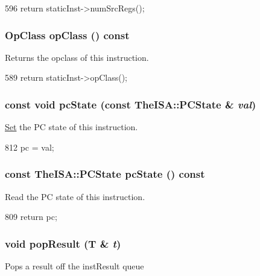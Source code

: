 \begin{DoxyCode}
596 { return staticInst->numSrcRegs(); }
\end{DoxyCode}
\hypertarget{classBaseDynInst_aa4919f97cae20d4d82391c1fc6d5fda6}{
\subsubsection[{opClass}]{\setlength{\rightskip}{0pt plus 5cm}OpClass opClass () const}}
\label{classBaseDynInst_aa4919f97cae20d4d82391c1fc6d5fda6}
Returns the opclass of this instruction. 


\begin{DoxyCode}
589 { return staticInst->opClass(); }
\end{DoxyCode}
\hypertarget{classBaseDynInst_af074e0233f7b4c7bb80ca26182833bf6}{
\subsubsection[{pcState}]{\setlength{\rightskip}{0pt plus 5cm}const void pcState (const TheISA::PCState \& {\em val})}}
\label{classBaseDynInst_af074e0233f7b4c7bb80ca26182833bf6}
\hyperlink{classSet}{Set} the PC state of this instruction. 


\begin{DoxyCode}
812 { pc = val; }
\end{DoxyCode}
\hypertarget{classBaseDynInst_a50cdfb6f4ba5ad01abb9ae5b777d7182}{
\subsubsection[{pcState}]{\setlength{\rightskip}{0pt plus 5cm}const TheISA::PCState pcState () const}}
\label{classBaseDynInst_a50cdfb6f4ba5ad01abb9ae5b777d7182}
Read the PC state of this instruction. 


\begin{DoxyCode}
809 { return pc; }
\end{DoxyCode}
\hypertarget{classBaseDynInst_a8d4a144e868da0550434bd5ec9969982}{
\subsubsection[{popResult}]{\setlength{\rightskip}{0pt plus 5cm}void popResult (T \& {\em t})}}
\label{classBaseDynInst_a8d4a144e868da0550434bd5ec9969982}
Pops a result off the instResult queue 


